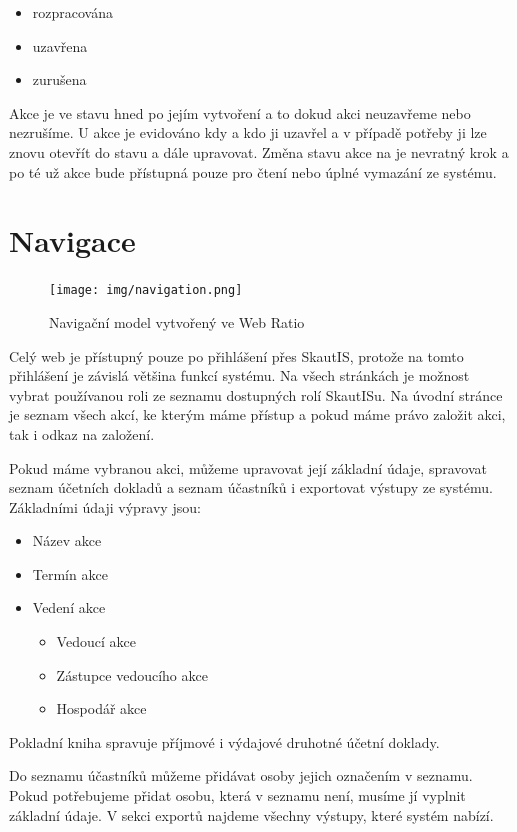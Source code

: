 \documentclass[thesis=B,czech]{FITthesis}[2011/06/14]
\begin{document}
 \begin{itemize}
 	\item rozpracována
	\item uzavřena
	\item zurušena
 \end{itemize} 
 
Akce je ve stavu  hned po jejím vytvoření a to dokud akci neuzavřeme nebo nezrušíme. U  akce je evidováno kdy a kdo ji uzavřel a v případě potřeby ji lze znovu otevřít do stavu  a dále upravovat. Změna stavu akce na  je nevratný krok a po té už akce bude přístupná pouze pro čtení nebo úplné vymazání ze systému.  

\section{Navigace}
 \begin{figure}[h] \centering
 	\texttt{[image: img/navigation.png]}
 	\caption[Navigační model]{Navigační model vytvořený ve Web Ratio}\label{fig:navigation-diagram}
 \end{figure}

Celý web je přístupný pouze po přihlášení přes SkautIS, protože na tomto přihlášení je závislá většina funkcí systému. Na všech stránkách je možnost vybrat používanou roli ze seznamu dostupných rolí SkautISu. Na úvodní stránce je seznam všech akcí, ke kterým máme přístup a pokud máme právo založit akci, tak i odkaz na založení.

Pokud máme vybranou akci, můžeme upravovat její základní údaje, spravovat seznam účetních dokladů a seznam účastníků i exportovat výstupy ze systému. Základními údaji výpravy jsou:
\begin{itemize}
	\item Název akce
	\item Termín akce
	\item Vedení akce
	\begin{itemize}
		\item Vedoucí akce
		\item Zástupce vedoucího akce
		\item Hospodář akce
	\end{itemize}
\end{itemize}

Pokladní kniha spravuje příjmové i výdajové druhotné účetní doklady. 

Do seznamu účastníků můžeme přidávat osoby jejich označením v seznamu. Pokud potřebujeme přidat osobu, která v seznamu není, musíme jí vyplnit základní údaje. V sekci exportů najdeme všechny výstupy, které systém nabízí.
\end{document}
